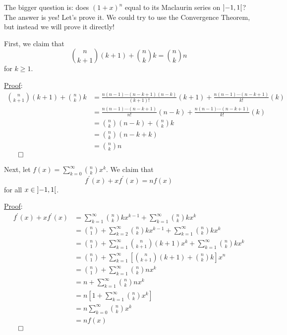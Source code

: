 The bigger question is: does $ (1+x)^n $ equal to its Maclaurin
series on $ \interval[open]{-1}{1} $? The answer is yes! Let's prove it.
We could try to use the Convergence Theorem, but instead we will prove it directly!

First, we claim that
\[ \binom{n}{k+1}(k+1)+\binom{n}{k}k=\binom{n}{k}n \]
for $ k\geqslant 1 $.

\underline{Proof}:
\begin{align*}
    \binom{n}{k+1}(k+1)+\binom{n}{k}k
     & =\frac{n(n-1)\cdots(n-k+1)(n-k)}{(k+1)!}(k+1)
    +\frac{n(n-1)\cdots(n-k+1)}{k!}(k)               \\
     & =\frac{n(n-1)\cdots(n-k+1)}{n!}(n-k)
    +\frac{n(n-1)\cdots(n-k+1)}{k!}(k)               \\
     & =\binom{n}{k}(n-k)+\binom{n}{k}k              \\
     & =\binom{n}{k}(n-k+k)                          \\
     & =\binom{n}{k}n
\end{align*}
$ \qed $

Next, let $ f(x)=\sum\limits_{k=0}^{\infty} \binom{n}{k}x^k $. We claim that
\[ f^\prime(x)+xf^\prime(x)=nf(x) \]
for all $ x\in\interval[open]{-1}{1} $.

\underline{Proof}:
\begin{align*}
    f^\prime(x)+xf^\prime(x)
     & =\sum\limits_{k=1}^{\infty} \binom{n}{k}k x^{k-1}+\sum\limits_{k=1}^{\infty}\binom{n}{k}
    k x^k                                                                                       \\
     & =\binom{n}{1}+\sum\limits_{k=2}^{\infty}
    \binom{n}{k}k x^{k-1}+\sum\limits_{k=1}^{\infty} \binom{n}{k}k x^k                          \\
     & =\binom{n}{1}+
    \sum\limits_{k=1}^{\infty} \binom{n}{k+1}(k+1)x^k+
    \sum\limits_{k=1}^{\infty} \binom{n}{k}k x^k                                                \\
     & =\binom{n}{1}+\sum\limits_{k=1}^{\infty}
    \left[ \binom{n}{k+1}(k+1)+\binom{n}{k}k \right]x^n                                         \\
     & =\binom{n}{1}+\sum\limits_{k=1}^{\infty} \binom{n}{k}n x^k                               \\
     & =n+\sum\limits_{k=1}^{\infty}\binom{n}{k}n x^k                                           \\
     & =n\left[ 1+\sum\limits_{k=1}^{\infty} \binom{n}{k}x^k \right]                            \\
     & =n \sum\limits_{k=0}^{\infty} \binom{n}{k}x^k                                            \\
     & =n f(x)
\end{align*}
$ \qed $

